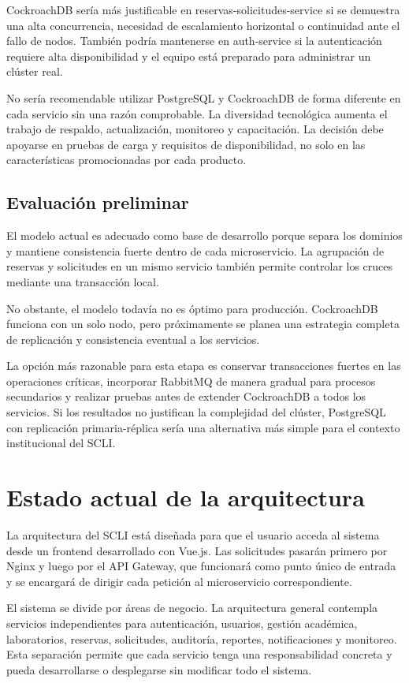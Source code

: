 \documentclass[conference]{IEEEtran}
\begin{document}
CockroachDB sería más justificable en reservas-solicitudes-service si se demuestra una alta concurrencia, necesidad de escalamiento horizontal o continuidad ante el fallo de nodos. También podría mantenerse en auth-service si la autenticación requiere alta disponibilidad y el equipo está preparado para administrar un clúster real.

No sería recomendable utilizar PostgreSQL y CockroachDB de forma diferente en cada servicio sin una razón comprobable. La diversidad tecnológica aumenta el trabajo de respaldo, actualización, monitoreo y capacitación. La decisión debe apoyarse en pruebas de carga y requisitos de disponibilidad, no solo en las características promocionadas por cada producto.

\subsection{Evaluación preliminar}
El modelo actual es adecuado como base de desarrollo porque separa los dominios y mantiene consistencia fuerte dentro de cada microservicio. La agrupación de reservas y solicitudes en un mismo servicio también permite controlar los cruces mediante una transacción local.

No obstante, el modelo todavía no es óptimo para producción. CockroachDB funciona con un solo nodo, pero próximamente se planea una estrategia completa de replicación y consistencia eventual a los servicios.

La opción más razonable para esta etapa es conservar transacciones fuertes en las operaciones críticas, incorporar RabbitMQ de manera gradual para procesos secundarios y realizar pruebas antes de extender CockroachDB a todos los servicios. Si los resultados no justifican la complejidad del clúster, PostgreSQL con replicación primaria-réplica sería una alternativa más simple para el contexto institucional del SCLI.

\section{Estado actual de la arquitectura}
La arquitectura del SCLI está diseñada para que el usuario acceda al sistema desde un frontend desarrollado con Vue.js. Las solicitudes pasarán primero por Nginx y luego por el API Gateway, que funcionará como punto único de entrada y se encargará de dirigir cada petición al microservicio correspondiente.

El sistema se divide por áreas de negocio. La arquitectura general contempla servicios independientes para autenticación, usuarios, gestión académica, laboratorios, reservas, solicitudes, auditoría, reportes, notificaciones y monitoreo. Esta separación permite que cada servicio tenga una responsabilidad concreta y pueda desarrollarse o desplegarse sin modificar todo el sistema.
\end{document}
